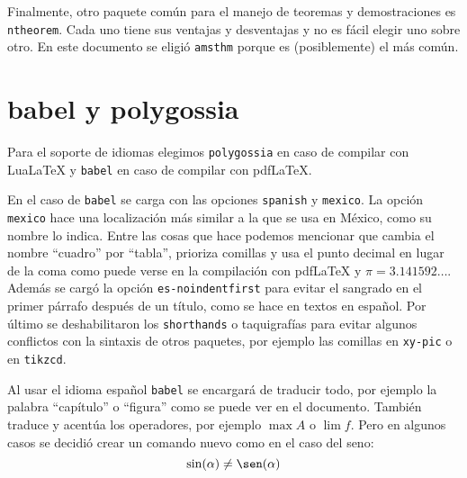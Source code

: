 Finalmente, otro paquete común para el manejo de teoremas y demostraciones
es \texttt{ntheorem}. Cada uno tiene sus ventajas y desventajas y no es
fácil elegir uno sobre otro. En este documento se eligió \texttt{amsthm}
porque es (posiblemente) el más común.


\section{babel y polygossia}%
\label{sec:babel}
Para el soporte de idiomas elegimos \texttt{polygossia} en caso de compilar
con Lua\LaTeX{} y \texttt{babel} en caso de compilar con pdf\LaTeX.

En el caso de \texttt{babel} se carga con las opciones \texttt{spanish} y
\texttt{mexico}. La opción \texttt{mexico} hace una localización más similar
a la que se usa en México, como su nombre lo indica. Entre las cosas que
hace podemos mencionar que cambia el nombre \enquote{cuadro} por \enquote{tabla},
prioriza comillas y usa el punto decimal en lugar de la coma como puede
verse en la compilación con pdf\LaTeX{} y \(\pi=3.141592\ldots \). Además se
cargó la opción \texttt{es-noindentfirst} para evitar el sangrado en el
primer párrafo después de un título, como se hace en textos en español. Por
último se deshabilitaron los \texttt{shorthands} o taquigrafías para evitar
algunos conflictos con la sintaxis de otros paquetes, por ejemplo las
comillas en \texttt{xy-pic} o en \texttt{tikzcd}.

Al usar el idioma español \texttt{babel} se encargará de traducir todo, por
ejemplo la palabra \enquote{capítulo} o \enquote{figura} como se puede ver en el
documento. También traduce y acentúa los operadores, por ejemplo \(\max A\)
o \(\lim f\).%
\ifpdftex%
Pero en algunos casos se decidió crear un comando nuevo como en el caso del
seno:
\[
  \sin(\alpha)\ne\sen(\alpha)
\]
\fi

